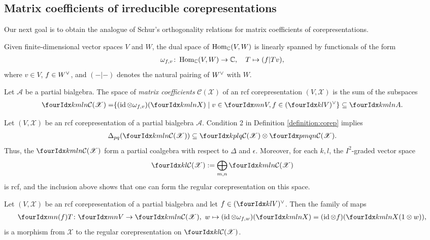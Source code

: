 \subsection{Matrix coefficients of irreducible corepresentations}

Our next goal is to obtain the analogue of Schur's orthogonality
relations for matrix coefficients of corepresentations.

Given finite-dimensional vector spaces $V$ and $W$, the dual space of
$\operatorname{Hom}_{\mathbb{C}}(V,W)$ is linearly spanned by functionals of the form
\begin{align*}
  \omega_{f,v} \colon \operatorname{Hom}_{\mathbb{C}}(V,W) \to \mathbb{C}, \quad T \mapsto  (f|Tv),
\end{align*}
where $v\in V$, $f\in W^{\vee}$, and $(-|-)$ denotes the natural
pairing of $W^{\vee}$ with $W$.
\begin{Def} Let $\mathscr{A}$ be a partial bialgebra. The space of
  \emph{matrix coefficients} $\mathcal{C}(\mathscr{X})$ of an rcf
  corepresentation $(V,\mathscr{X})$ is the sum of the subspaces
\begin{align*}
  \Gr{\mathcal{C}(\mathscr{X})}{k}{l}{m}{n} &= \span \left\{ (\id \otimes
    \omega_{f,v})(\Gr{X}{k}{l}{m}{n}) \mid v\in \Gru{V}{m}{n}, f \in
    \dual{(\Gru{V}{k}{l})} \right\} \subseteq \Gr{A}{k}{l}{m}{n}.
\end{align*}
\end{Def}
Let $(V,\mathscr{X})$ be  an rcf corepresentation of a partial bialgebra
$\mathscr{A}$.  Condition 2 in Definition \ref{definition:corep}
implies
\begin{align} \label{eq:rep-matrix-delta}
  \Delta_{pq}(\Gr{\mathcal{C}(\mathscr{X})}{k}{l}{m}{n}) \subseteq
  \Gr{\mathcal{C}(\mathscr{X})}{k}{l}{p}{q} \otimes
  \Gr{\mathcal{C}(\mathscr{X})}{p}{q}{m}{n}.
\end{align}
Thus, the $\Gr{\mathcal{C}(\mathscr{X})}{k}{l}{m}{n}$ form a partial
coalgebra with respect to $\Delta$ and $\epsilon$.  Moreover, for each
$k,l$, the $I^{2}$-graded vector  space
\begin{align*}
  \Gru{\mathcal{C}(\mathscr{X})}{k}{l}:=\bigoplus_{m,n }
  \Gr{\mathcal{C}(\mathscr{X})}{k}{l}{m}{n}
\end{align*}
is rcf, and the inclusion above shows that one can
form the regular corepresentation on this space.
\begin{Lem} \label{lemma:rep-regular-embedding}
  Let $(V,\mathscr{X})$ be an rcf corepresentation
  of a partial bialgebra and let $f\in
  \dual{(\Gru{V}{k}{l})}$. Then the family of maps
  \begin{align*}
    \Gr{T}{m}{n}{}{(f)} \colon \Gru{V}{m}{n} \to
    \Gr{\mathcal{C}(\mathscr{X})}{k}{l}{m}{n}, \ w \mapsto (\id
    \otimes \omega_{f,w})(\Gr{X}{k}{l}{m}{n})=(\id \otimes
    f)(\Gr{X}{k}{l}{m}{n}(1 \otimes w)),
  \end{align*}
  is a morphism from $\mathscr{X}$ to the regular corepresentation on
  $\Gru{\mathcal{C}(\mathscr{X})}{k}{l}$.
\end{Lem}

